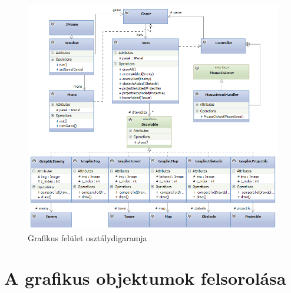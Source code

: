 \begin{figure}[H]
\begin{center}
\includegraphics[width=18cm]{images/ch11/very_final_uml_doge_diagram.png}
\caption{Grafikus felület osztálydigaramja}
\label{fig:Graphic_class_diag}
\end{center}
\end{figure}

\pagebreak
\section{A grafikus objektumok felsorolása}

